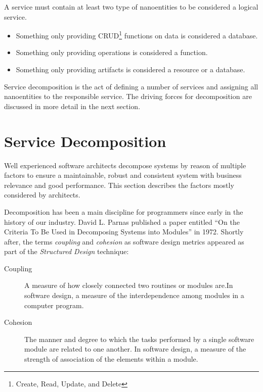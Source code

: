 A service must contain  at least two type of nanoentities to be considered a logical service. 
\begin{itemize}
\item Something only providing CRUD\footnote{Create, Read, Update, and Delete} functions on data is considered a database. 
\item Something only providing operations is considered a function. 
\item Something only providing artifacts is considered a resource or a database. 
\end{itemize}

Service decomposition is the act of defining a number of services and assigning all nanoentities to the responsible service. The driving forces for decomposition are discussed in more detail in the next section.


\section{Service Decomposition}

Well experienced software architects decompose systems by reason of multiple factors to ensure a maintainable, robust and consistent system with business relevance and good performance. This section describes the factors mostly considered by architects. 

Decomposition has been a main discipline for programmers since early in the history of our industry. David L. Parnas published a paper entitled \enquote{On the Criteria To Be Used in Decomposing Systems into Modules} in 1972\cite{parnaDecomposing}. Shortly after, the terms \textit{coupling} and \textit{cohesion} as software design metrics appeared as part of the \textit{Structured Design} technique\cite{structuredDesign}:

\begin{description}
	\item[Coupling] A measure of how closely connected two routines or modules are.\newline In	software design, a measure of the interdependence among modules in a computer program.\cite{softwareVocabulary}
	\item[Cohesion] The manner and degree to which the tasks performed by a single software module are related to one another. \newline 
	In software design, a measure of the strength of association of the elements within a module.\cite{softwareVocabulary}
\end{description}

